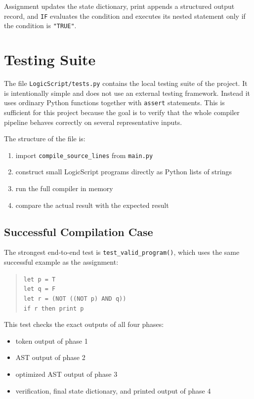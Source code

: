\documentclass[11pt]{article}
\begin{document}
Assignment updates the state dictionary, print appends a structured output record, and \texttt{IF} evaluates the condition and executes its nested statement only if the condition is \texttt{"TRUE"}.

\section{Testing Suite}
The file \texttt{LogicScript/tests.py} contains the local testing suite of the project. It is intentionally simple and does not use an external testing framework. Instead it uses ordinary Python functions together with \texttt{assert} statements. This is sufficient for this project because the goal is to verify that the whole compiler pipeline behaves correctly on several representative inputs.

The structure of the file is:
\begin{enumerate}
    \item import \texttt{compile\_source\_lines} from \texttt{main.py}
    \item construct small LogicScript programs directly as Python lists of strings
    \item run the full compiler in memory
    \item compare the actual result with the expected result
\end{enumerate}

\subsection{Successful Compilation Case}
The strongest end-to-end test is \texttt{test\_valid\_program()}, which uses the same successful example as the assignment:
\begin{quote}
\texttt{let p = T}\\
\texttt{let q = F}\\
\texttt{let r = (NOT ((NOT p) AND q))}\\
\texttt{if r then print p}
\end{quote}
This test checks the exact outputs of all four phases:
\begin{itemize}
    \item token output of phase 1
    \item AST output of phase 2
    \item optimized AST output of phase 3
    \item verification, final state dictionary, and printed output of phase 4
\end{itemize}
\end{document}
